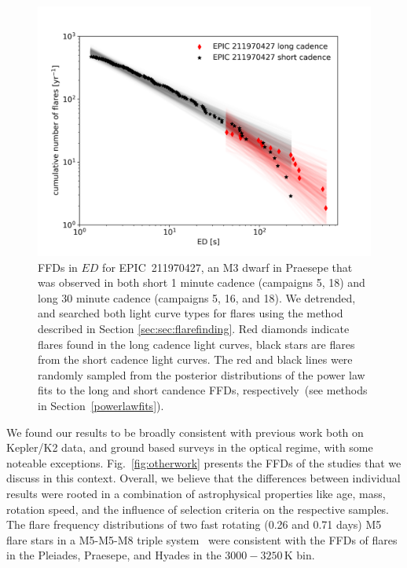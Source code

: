 \documentclass{aa}
\begin{document}
\begin{figure}[ht!]
    \centering
    \includegraphics[width=\hsize]{pics/FFDs/EPIC211970427_long_vs_short_cadence_ffd.png}
    \caption{FFDs in $ED$ for EPIC~211970427, an M3 dwarf in Praesepe that was observed in both short 1 minute cadence (campaigns 5, 18) and long 30 minute cadence (campaigns 5, 16, and 18). We detrended, and searched both light curve types for flares using the method described in Section \ref{sec:sec:flarefinding}. Red diamonds indicate flares found in the long cadence light curves, black stars are flares from the short cadence light curves. The red and black lines were randomly sampled from the posterior distributions of the power law fits to the long and short candence FFDs, respectively~(see methods in Section~\ref{powerlawfits}).}          
    \label{fig:shortlong}
\end{figure}
We found our results to be broadly consistent with previous work both on Kepler/K2 data, and ground based surveys in the optical regime, with some noteable exceptions. Fig.~\ref{fig:otherwork} presents the FFDs of the studies that we discuss in this context. Overall, we believe that the differences between individual results were rooted in a combination of astrophysical properties like age, mass, rotation speed, and the influence of selection criteria on the respective samples. 
\\
The flare frequency distributions of two fast rotating (0.26 and 0.71 days) M5 flare stars in a M5-M5-M8 triple system~\citep{lurie2015} were consistent with the FFDs of flares in the Pleiades, Praesepe, and Hyades in the $3000-3250\,$K bin. 
\end{document}
